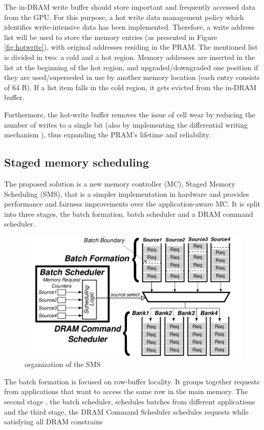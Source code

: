 \documentclass[12pt,journal,compsoc]{IEEEtran}
\begin{document}
The in-DRAM write buffer should store important and frequently accessed data from the GPU. For this purpose, a hot write data management policy which identifies write-intensive data has been implemented. Therefore, a write address list will be used to store the memory entries (as presented in Figure \ref{fig:hotwrite}), with original addresses residing in the PRAM. The mentioned list is divided in two: a cold and a hot region. Memory addresses are inserted in the list at the beginning of the hot region, and upgraded/downgraded one position if they are used/superseded in use by another memory location (each entry consists of 64 B). If a list item falls in the cold region, it gets evicted from the in-DRAM buffer.

Furthermore, the hot-write buffer removes the issue of cell wear by reducing the number of writes to a single bit (also by implementing the differential writing mechanism \cite{PRAM}), thus expanding the PRAM's lifetime and reliability.

\subsection{Staged memory scheduling}
The proposed solution is a new memory controller (MC), Staged Memory Scheduling (SMS),  that is a simpler implementation in hardware and provides performance and fairness improvements over the application-aware MC.  It is split into three stages, the batch formation, batch scheduler and a DRAM command scheduler.

\begin{figure}[H]
	\centering
	\includegraphics[width = 8 cm]{graphics/SmS.png}
	\caption{organization of the SMS \cite{SmS}}
\end{figure}

The batch formation is focused on row-buffer locality.  It groups together requests from applications that want to access the same row in the main memory. The second stage , the batch scheduler, schedules batches from different applications and the third stage, the DRAM Command Scheduler schedules requests while satisfying all DRAM constrains \cite{SmS}
\end{document}
